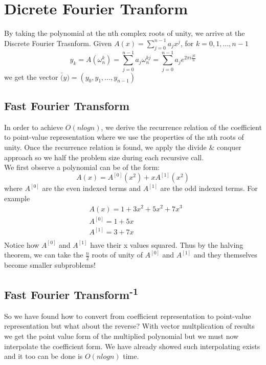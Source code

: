 \documentclass[11pt,leffttterpaper]{truthesis}
\theoremstyle{plain}
\begin{document}
\chapter{Dicrete Fourier Tranform}
By taking the polynomial at the nth
complex roots of unity, we arrive at the Discrete Fourier Trasnform.
Given \( A(x) = \sum_{j = 0}^{n-1}a_jx^j\), for \(k = 0, 1, ..., n-1\)
\[
  y_k = A(\omega_n^k) = \sum_{j = 0}^{n-1}a_j\omega_n^{kj} = \sum_{j=0}^{n-1}a_je^{2\pi i\frac{jk}{n}}
\]
we get the vector \(\bar(y) = (y_0,y_1,...,y_{n-1})\)

\section {Fast Fourier Transform}
In order to achieve \(O(nlogn)\), we derive the recurrence relation
of the coefficient to point-value representation where 
we use the properties of the nth roots of unity. Once the recurrence
relation is found, we apply the divide \& conquer approach so
we half the problem size during each recursive call. \\
$ $\\
We first observe a polynomial can be of the form:
\[
  A(x) = A^{[0]}(x^2) + xA^{[1]}(x^2)
\]
where \(A^{[0]}\) are the even indexed terms and \(A^{[1]}\) are the
odd indexed terms. For example
\begin{align*}
  &A(x) = 1 + 3x^2 + 5x^2 +7x^3 \\
  &A^{[0]} = 1 + 5x \\
  &A^{[1]} = 3 + 7x \\
\end{align*}
Notice how \(A^{[0]}\) and \(A^{[1]}\) have their x values squared. Thus
by the halving theorem, we can take the \(\frac{n}{2}\) roots of unity of
\(A^{[0]}\) and \(A^{[1]}\) and they themselves become smaller subproblems!

\section {Fast Fourier Transform\textsuperscript{-1}}
So we have found how to convert from coefficient representation to
point-value representation but what about the reverse? With
vector multplication of results we get the point value form of the multiplied
polynomial but we must now interpolate the coefficient form.
We have already showed such interpolating exists and it too can be
done is \(O(nlogn)\) time.
\end{document}
